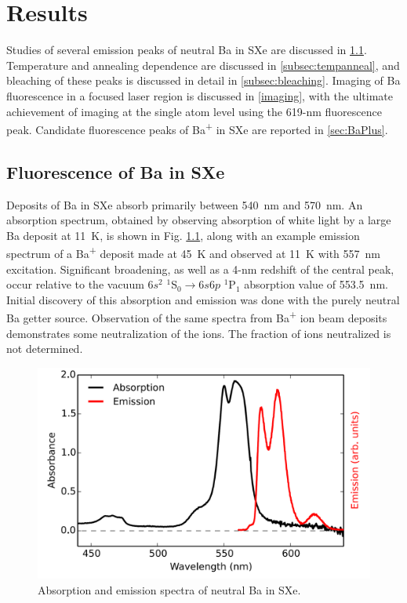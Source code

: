 \chapter{Results}

Studies of several emission peaks of neutral Ba in SXe are discussed in \ref{sec:fluorescence}.  Temperature and annealing dependence are discussed in \ref{subsec:tempanneal}, and bleaching of these peaks is discussed in detail in \ref{subsec:bleaching}.  Imaging of Ba fluorescence in a focused laser region is discussed in \ref{imaging}, with the ultimate achievement of imaging at the single atom level using the 619-nm fluorescence peak.  Candidate fluorescence peaks of Ba\textsuperscript{+} in SXe are reported in \ref{sec:BaPlus}.

\section{Fluorescence of Ba in SXe}
\label{sec:fluorescence}

Deposits of Ba in SXe absorb primarily between 540~nm and 570~nm.  An absorption spectrum, obtained by observing absorption of white light by a large Ba deposit at 11~K, is shown in Fig. \ref{fig:BaAbs}, along with an example emission spectrum of a Ba\textsuperscript{+} deposit made at 45~K and observed at 11~K with 557~nm excitation.  Significant broadening, as well as a 4-nm redshift  of the central peak, occur relative to the vacuum $6s^{2}$ $^{1}$S$_{0} \rightarrow 6s6p$ $^{1}$P$_{1}$ absorption value of 553.5~nm.  Initial discovery of this absorption and emission was done with the purely neutral Ba getter source.  Observation of the same spectra from Ba\textsuperscript{+} ion beam deposits demonstrates some neutralization of the ions.  The fraction of ions neutralized is not determined.  \cite{Mong2015,Shon,Brian}

\begin{figure} %
        \centering
                \includegraphics[width=.7\textwidth]{figures/BaAbs_fromBaSpec.png}
                \caption{Absorption and emission spectra of neutral Ba in SXe.  \cite{Mong2015}}
\label{fig:BaAbs}
\end{figure}

